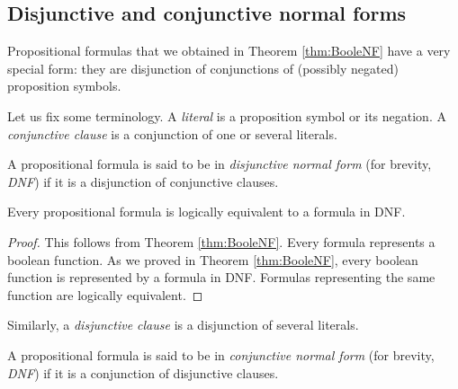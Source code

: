\begin{page}

\subsection{Disjunctive and conjunctive normal forms}
Propositional formulas that we obtained in Theorem \ref{thm:BooleNF} have a very special form:
they are disjunction of conjunctions of (possibly negated) proposition symbols.

Let us fix some terminology.
A \emph{literal} is a proposition symbol or its negation.
A \emph{conjunctive clause} is a conjunction of one or several literals.


\end{page}

\begin{page}

\begin{dfn}
A propositional formula is said to be in \emph{disjunctive normal form} (for brevity, \emph{DNF})
if it is a disjunction of conjunctive clauses.
\end{dfn}

\end{page}

\begin{page}

\begin{cor}
\label{cor:DNF}
Every propositional formula is logically equivalent to a formula in DNF.
\end{cor}

\end{page}

\begin{page}

\begin{proof}
This follows from Theorem \ref{thm:BooleNF}.
Every formula represents a boolean function.
As we proved in Theorem \ref{thm:BooleNF}, every boolean function is represented by a formula in DNF.
Formulas representing the same function are logically equivalent.
\end{proof}

Similarly, a \emph{disjunctive clause} is a disjunction of several literals.

\end{page}

\begin{page}

\begin{dfn}
A propositional formula is said to be in \emph{conjunctive normal form} (for brevity, \emph{DNF})
if it is a conjunction of disjunctive clauses.
\end{dfn}

\end{page}

